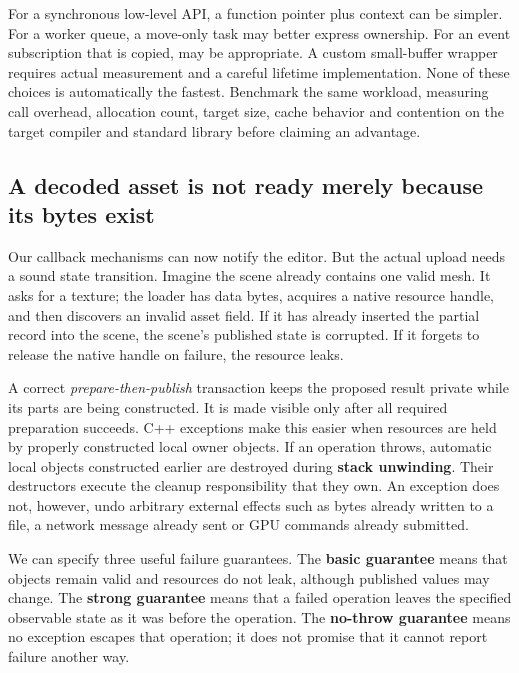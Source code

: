 For a synchronous low-level API, a function pointer plus context can be simpler. For a worker queue, a move-only task may better express ownership. For an event subscription that is copied,  may be appropriate. A custom small-buffer wrapper requires actual measurement and a careful lifetime implementation. None of these choices is automatically the fastest. Benchmark the same workload, measuring call overhead, allocation count, target size, cache behavior and contention on the target compiler and standard library before claiming an advantage.

\subsection{A decoded asset is not ready merely because its bytes exist}\label{05-engine-i-ch004-a-decoded-asset-is-not-ready-merely-because-its-bytes-exist}

\hypertarget{05-engine-i-ch004-a-decoded-asset-is-not-ready-merely-because-its-bytes-exist}{}

Our callback mechanisms can now notify the editor. But the actual upload needs a sound state transition. Imagine the scene already contains one valid mesh. It asks for a texture; the loader has data bytes, acquires a native resource handle, and then discovers an invalid asset field. If it has already inserted the partial record into the scene, the scene's published state is corrupted. If it forgets to release the native handle on failure, the resource leaks.

A correct \emph{prepare-then-publish} transaction keeps the proposed result private while its parts are being constructed. It is made visible only after all required preparation succeeds. C++ exceptions make this easier when resources are held by properly constructed local owner objects. If an operation throws, automatic local objects constructed earlier are destroyed during \textbf{stack unwinding}. Their destructors execute the cleanup responsibility that they own. An exception does not, however, undo arbitrary external effects such as bytes already written to a file, a network message already sent or GPU commands already submitted.

We can specify three useful failure guarantees. The \textbf{basic guarantee} means that objects remain valid and resources do not leak, although published values may change. The \textbf{strong guarantee} means that a failed operation leaves the specified observable state as it was before the operation. The \textbf{no-throw guarantee} means no exception escapes that operation; it does not promise that it cannot report failure another way.

